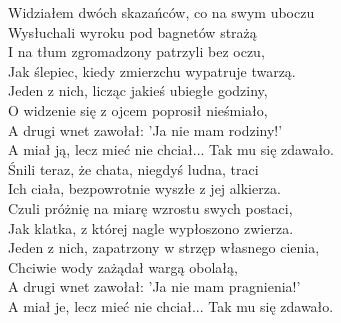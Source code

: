 \begin{text}
    Widziałem dwóch skazańców, co na swym uboczu\\
    Wysłuchali wyroku pod bagnetów strażą\\
    I na tłum zgromadzony patrzyli bez oczu,\\
    Jak ślepiec, kiedy zmierzchu wypatruje twarzą.\\
    Jeden z nich, licząc jakieś ubiegłe godziny,\\
    O widzenie się z ojcem poprosił nieśmiało,\\
    A drugi wnet zawołał: 'Ja nie mam rodziny!'\\
    A miał ją, lecz mieć nie chciał... Tak mu się zdawało.\\

    Śnili teraz, że chata, niegdyś ludna, traci\\
    Ich ciała, bezpowrotnie wyszłe z jej alkierza.\\
    Czuli próżnię na miarę wzrostu swych postaci,\\
    Jak klatka, z której nagle wypłoszono zwierza.\\
    Jeden z nich, zapatrzony w strzęp własnego cienia,\\
    Chciwie wody zażądał wargą obolałą,\\
    A drugi wnet zawołał: 'Ja nie mam pragnienia!'\\
    A miał je, lecz mieć nie chciał... Tak mu się zdawało.
\end{text}
\begin{chord}
\end{chord}